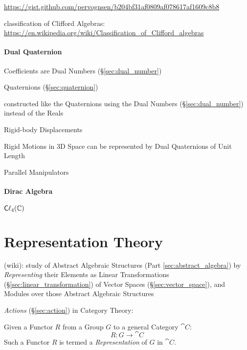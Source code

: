 \url{https://gist.github.com/pervognsen/b204bf31af0809af078617af1609c8b8}

classification of Clifford Algebras:
\url{https://en.wikipedia.org/wiki/Classification_of_Clifford_algebras}



\paragraph{Dual Quaternion}\label{sec:dual_quaternion}\hfill


Coefficients are Dual Numbers (\S\ref{sec:dual_number})

\fist Quaternions (\S\ref{sec:quaternion})

constructed like the Quaternions using the Dual Numbers
(\S\ref{sec:dual_number}) instead of the Reals

Rigid-body Displacements

Rigid Motions in 3D Space can be represented by Dual Quaternions of Unit Length

Parallel Manipulators



\paragraph{Dirac Algebra}\label{sec:dirac_algebra}\hfill

$\mathsf{C}\ell_4(\mathbb{C})$



\section{Representation Theory}\label{sec:representation_theory}

(wiki): study of Abstract Algebraic Structures (Part \ref{sec:abstract_algebra})
by \emph{Representing} their Elements as Linear Transformations
(\S\ref{sec:linear_transformation}) of Vector Spaces (\S\ref{sec:vector_space}),
and Modules over those Abstract Algebraic Structures


\fist \emph{Actions} (\S\ref{sec:action}) in Category Theory:

Given a Functor $R$ from a Group $G$ to a general Category $\cat{C}$:
\[
    R : G \rightarrow \cat{C}
\]
Such a Functor $R$ is termed a \emph{Representation} of $G$ in $\cat{C}$.

